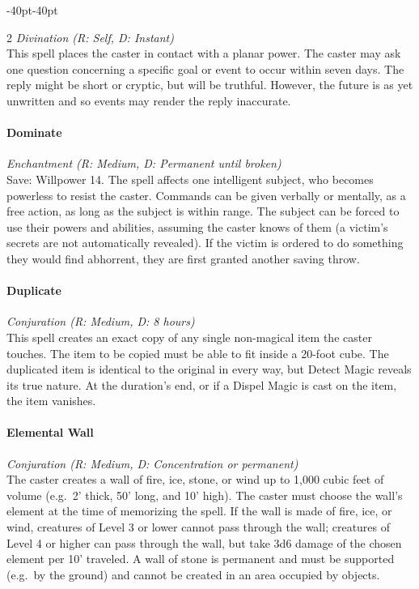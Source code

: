 \documentclass{book}
\begin{document}
\begin{adjustwidth}{-40pt}{-40pt}
\begin{multicols}{2}
\emph{Divination (R: Self, D: Instant)}\\
This spell places the caster in contact with a planar power. The caster
may ask one question concerning a specific goal or event to occur within
seven days. The reply might be short or cryptic, but will be truthful.
However, the future is as yet unwritten and so events may render the
reply inaccurate.

\paragraph{Dominate}\label{dominate}

\emph{Enchantment (R: Medium, D: Permanent until broken)}\\
Save: Willpower 14. The spell affects one intelligent subject, who
becomes powerless to resist the caster. Commands can be given verbally
or mentally, as a free action, as long as the subject is within range.
The subject can be forced to use their powers and abilities, assuming
the caster knows of them (a victim's secrets are not automatically
revealed). If the victim is ordered to do something they would find
abhorrent, they are first granted another saving throw.

\paragraph{Duplicate}\label{duplicate}

\emph{Conjuration (R: Medium, D: 8 hours)}\\
This spell creates an exact copy of any single non-magical item the
caster touches. The item to be copied must be able to fit inside a
20-foot cube. The duplicated item is identical to the original in every
way, but Detect Magic reveals its true nature. At the duration's end, or
if a Dispel Magic is cast on the item, the item vanishes.

\paragraph{Elemental Wall}\label{elemental-wall}

\emph{Conjuration (R: Medium, D: Concentration or permanent)}\\
The caster creates a wall of fire, ice, stone, or wind up to 1,000 cubic
feet of volume (e.g.~2' thick, 50' long, and 10' high). The caster must
choose the wall's element at the time of memorizing the spell. If the
wall is made of fire, ice, or wind, creatures of Level 3 or lower cannot
pass through the wall; creatures of Level 4 or higher can pass through
the wall, but take 3d6 damage of the chosen element per 10' traveled. A
wall of stone is permanent and must be supported (e.g.~by the ground)
and cannot be created in an area occupied by objects.


\end{multicols}
\end{adjustwidth}
\end{document}
